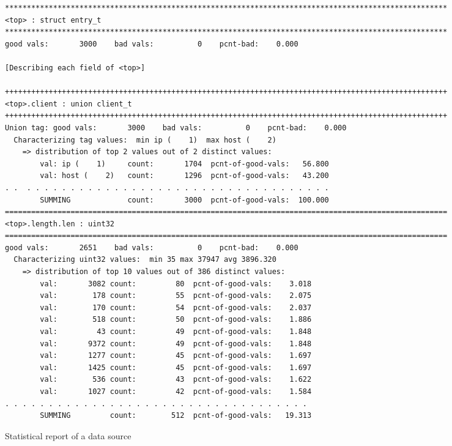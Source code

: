 \begin{figure*}[th]
{\footnotesize
\begin{verbatim}
*****************************************************************************************************
<top> : struct entry_t
*****************************************************************************************************
good vals:       3000    bad vals:          0    pcnt-bad:    0.000

[Describing each field of <top>]

+++++++++++++++++++++++++++++++++++++++++++++++++++++++++++++++++++++++++++++++++++++++++++++++++++++
<top>.client : union client_t
+++++++++++++++++++++++++++++++++++++++++++++++++++++++++++++++++++++++++++++++++++++++++++++++++++++
Union tag: good vals:       3000    bad vals:          0    pcnt-bad:    0.000
  Characterizing tag values:  min ip (    1)  max host (    2)
    => distribution of top 2 values out of 2 distinct values:
        val: ip (    1)     count:       1704  pcnt-of-good-vals:   56.800
        val: host (    2)   count:       1296  pcnt-of-good-vals:   43.200
. .  . . . . . . . . . . . . . . . . . . . . . . . . . . . . . . . . . . .
        SUMMING             count:       3000  pcnt-of-good-vals:  100.000
=====================================================================================================
<top>.length.len : uint32
=====================================================================================================
good vals:       2651    bad vals:          0    pcnt-bad:    0.000
  Characterizing uint32 values:  min 35 max 37947 avg 3896.320
    => distribution of top 10 values out of 386 distinct values:
        val:       3082 count:         80  pcnt-of-good-vals:    3.018
        val:        178 count:         55  pcnt-of-good-vals:    2.075
        val:        170 count:         54  pcnt-of-good-vals:    2.037
        val:        518 count:         50  pcnt-of-good-vals:    1.886
        val:         43 count:         49  pcnt-of-good-vals:    1.848
        val:       9372 count:         49  pcnt-of-good-vals:    1.848
        val:       1277 count:         45  pcnt-of-good-vals:    1.697
        val:       1425 count:         45  pcnt-of-good-vals:    1.697
        val:        536 count:         43  pcnt-of-good-vals:    1.622
        val:       1027 count:         42  pcnt-of-good-vals:    1.584
. . . . . . . . . . . . . . . . . . . . . . . . . . . . . . . . . . .
        SUMMING         count:        512  pcnt-of-good-vals:   19.313
\end{verbatim}
}
\caption{Statistical report of a \ai{} data source}\label{fig:accum}
\end{figure*}


